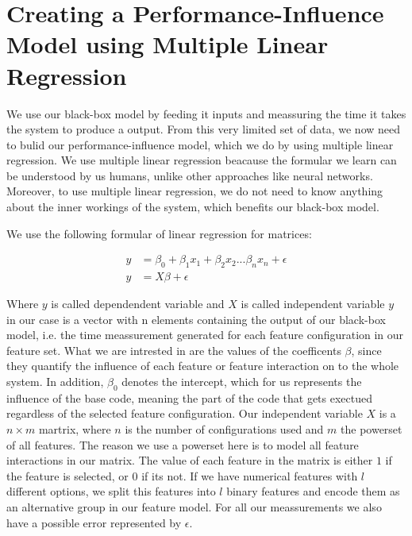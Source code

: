 \section{Creating a Performance-Influence Model using Multiple Linear Regression}
We use our black-box model by feeding it inputs and meassuring the time it takes the system to produce a output. From this 
very limited set of data, we now need to bulid our performance-influence model, which we do by using multiple linear regression.
We use multiple linear regression beacause the formular we learn can be understood by us humans, unlike other approaches like neural networks.
Moreover, to use multiple linear regression, we do not need to know anything about the inner workings of the system,
which benefits our black-box model. \cite{Linear-Regression-Performance}

We use the following formular of linear regression for matrices\cite{Linear-Regression-Performance}:

\begin{align*}
        y &= \beta_0 + \beta_1 x_1 + \beta_2 x_2 ... \beta_n x_n + \epsilon   \\
        y &= X \beta + \epsilon
\end{align*}


Where $y$ is called dependendent variable and $X$ is called independent variable $y$ in our case is a vector with n elements containing
the output of our black-box model, i.e. the time meassurement generated for each feature configuration in our feature set. What we
are intrested in are the values of the coefficents $\beta$, since they quantify the influence of each feature or feature interaction
on to the whole system. In addition, $\beta_0$ denotes the intercept, which for us represents the influence of the base code, meaning
the part of the code that gets exectued regardless of the selected feature configuration.
Our independent variable $X$ is a $n \times m$ martrix, where $n$ is the number of configurations used and $m$ the powerset of all
features. The reason we use a powerset here is to model all feature interactions in our matrix.
The value of each feature in the matrix is either $1$ if the feature is selected, or $0$ if its not. If we have numerical features with $l$
different options, we split this features into $l$ binary features and encode them as an alternative group in our feature model.
For all our meassurements we also have a possible error represented by $\epsilon$. \cite{Linear-Regression}



